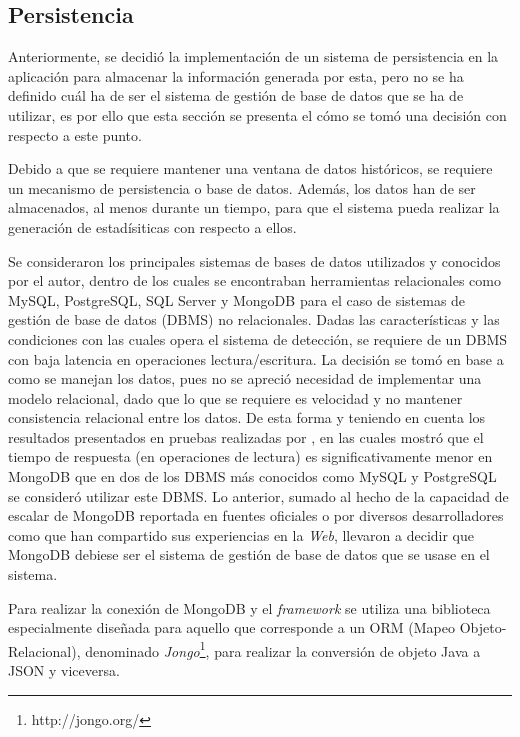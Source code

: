 \subsection{Persistencia}
\label{sec:diseno:persistencia}

Anteriormente, se decidió la implementación de un sistema de persistencia en la aplicación para almacenar la información generada por esta, pero no se ha definido cuál ha de ser el sistema de gestión de base de datos que se ha de utilizar, es por ello que esta sección se presenta el cómo se tomó una decisión con respecto a este punto.

Debido a que se requiere mantener una ventana de datos históricos, se requiere un mecanismo de persistencia o base de datos. Además, los datos han de ser almacenados, al menos durante un tiempo, para que el sistema pueda realizar la generación de estadísiticas con respecto a ellos.

Se consideraron los principales sistemas de bases de datos utilizados y conocidos por el autor, dentro de los cuales se encontraban herramientas relacionales como MySQL, PostgreSQL, SQL Server y MongoDB para el caso de sistemas de gestión de base de datos (DBMS) no relacionales. Dadas las características y las condiciones con las cuales opera el sistema de detección, se requiere de un DBMS con baja latencia en operaciones lectura/escritura. La decisión se tomó en base a como se manejan los datos, pues no se apreció necesidad de implementar una modelo relacional, dado que lo que se requiere es velocidad y no mantener consistencia relacional entre los datos. De esta forma y teniendo en cuenta los resultados presentados en pruebas realizadas por \citep{MongoPerformance}, en las cuales mostró que el tiempo de respuesta (en operaciones de lectura) es significativamente menor en MongoDB que en dos de los DBMS más conocidos como MySQL y PostgreSQL se consideró utilizar este DBMS. Lo anterior, sumado al hecho de la capacidad de escalar de MongoDB reportada en fuentes oficiales o por diversos desarrolladores como \citep{MongoDBScalability} que han compartido sus experiencias en la \textit{Web}, llevaron a decidir que MongoDB debiese ser el sistema de gestión de base de datos que se usase en el sistema.

Para realizar la conexión de MongoDB y el \textit{framework} se utiliza una biblioteca especialmente diseñada para aquello que corresponde a un ORM (Mapeo Objeto-Relacional), denominado \textit{Jongo}\footnote{http://jongo.org/}, para realizar la conversión de objeto Java a JSON y viceversa.

